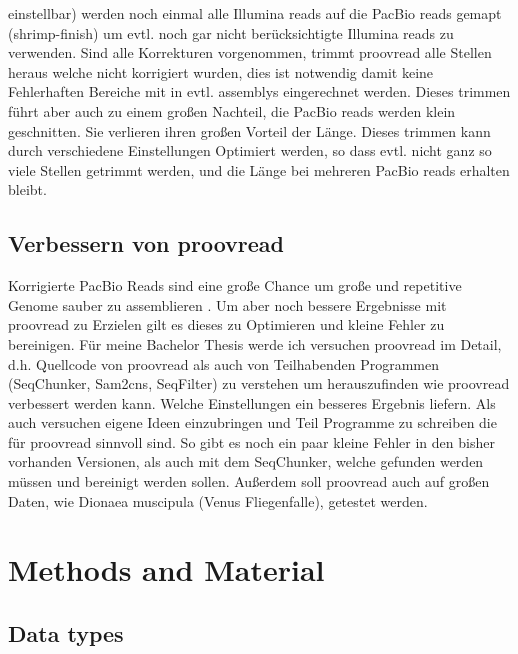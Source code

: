 \documentclass{scrartcl}
\begin{document}
einstellbar) werden noch einmal alle Illumina reads auf die PacBio reads gemapt (shrimp-finish) um evtl. noch gar nicht berücksichtigte Illumina reads zu verwenden. 
Sind alle Korrekturen vorgenommen, trimmt proovread alle Stellen heraus welche nicht korrigiert wurden, dies ist notwendig damit keine Fehlerhaften Bereiche mit in evtl. assemblys 
eingerechnet werden. Dieses trimmen führt aber auch zu einem großen Nachteil, die PacBio reads werden klein geschnitten. Sie verlieren ihren großen Vorteil der Länge. 
Dieses trimmen kann durch verschiedene Einstellungen Optimiert werden, so dass evtl. nicht ganz so viele Stellen getrimmt werden, und die Länge bei mehreren PacBio reads
erhalten bleibt. 

\subsection{Verbessern von proovread}
\label{sec-3-4}
Korrigierte PacBio Reads sind eine große Chance um große und repetitive Genome sauber zu assemblieren \footnotemark[3]{}. Um aber noch bessere Ergebnisse mit proovread zu Erzielen gilt es 
dieses zu Optimieren und kleine Fehler zu bereinigen. Für meine Bachelor Thesis werde ich versuchen proovread im Detail, d.h. Quellcode von proovread als auch von Teilhabenden
Programmen (SeqChunker, Sam2cns, SeqFilter) zu verstehen um herauszufinden wie proovread verbessert werden kann. Welche Einstellungen ein besseres Ergebnis liefern. Als auch versuchen
eigene Ideen einzubringen und Teil Programme zu schreiben die für proovread sinnvoll sind. So gibt es noch ein paar kleine Fehler in den bisher vorhanden Versionen, als auch
mit dem SeqChunker, welche gefunden werden müssen und bereinigt werden sollen. Außerdem soll proovread auch auf großen Daten, wie Dionaea muscipula (Venus Fliegenfalle), getestet 
werden. 

\section{Methods and Material}
\label{sec-4}
\subsection{Data types}
\label{sec-4-1}
\end{document}
